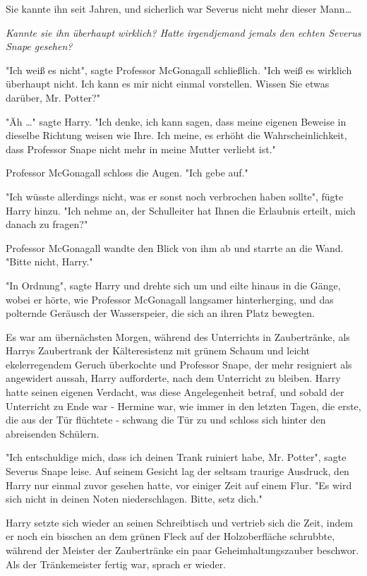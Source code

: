{Sie kannte ihn seit Jahren, und sicherlich war Severus nicht mehr dieser Mann…

\emph{Kannte sie ihn überhaupt wirklich? Hatte irgendjemand jemals den echten Severus Snape gesehen?}

"Ich weiß es nicht", sagte Professor McGonagall schließlich. "Ich weiß es wirklich überhaupt nicht. Ich kann es mir nicht einmal vorstellen. Wissen Sie etwas darüber, Mr. Potter?"

"Äh …" sagte Harry. "Ich denke, ich kann sagen, dass meine eigenen Beweise in dieselbe Richtung weisen wie Ihre. Ich meine, es erhöht die Wahrscheinlichkeit, dass Professor Snape nicht mehr in meine Mutter verliebt ist."

Professor McGonagall schloss die Augen. "Ich gebe auf."

"Ich wüsste allerdings nicht, was er sonst noch verbrochen haben sollte", fügte Harry hinzu. "Ich nehme an, der Schulleiter hat Ihnen die Erlaubnis erteilt, mich danach zu fragen?"

Professor McGonagall wandte den Blick von ihm ab und starrte an die Wand.\\ "Bitte nicht, Harry."

"In Ordnung", sagte Harry und drehte sich um und eilte hinaus in die Gänge, wobei er hörte, wie Professor McGonagall langsamer hinterherging, und das polternde Geräusch der Wasserspeier, die sich an ihren Platz bewegten.

Es war am übernächsten Morgen, während des Unterrichts in Zaubertränke, als Harrys Zaubertrank der Kälteresistenz mit grünem Schaum und leicht ekelerregendem Geruch überkochte und Professor Snape, der mehr resigniert als angewidert aussah, Harry aufforderte, nach dem Unterricht zu bleiben. Harry hatte seinen eigenen Verdacht, was diese Angelegenheit betraf, und sobald der Unterricht zu Ende war - Hermine war, wie immer in den letzten Tagen, die erste, die aus der Tür flüchtete - schwang die Tür zu und schloss sich hinter den abreisenden Schülern.

"Ich entschuldige mich, dass ich deinen Trank ruiniert habe, Mr. Potter", sagte Severus Snape leise. Auf seinem Gesicht lag der seltsam traurige Ausdruck, den Harry nur einmal zuvor gesehen hatte, vor einiger Zeit auf einem Flur. "Es wird sich nicht in deinen Noten niederschlagen. Bitte, setz dich."

Harry setzte sich wieder an seinen Schreibtisch und vertrieb sich die Zeit, indem er noch ein bisschen an dem grünen Fleck auf der Holzoberfläche schrubbte, während der Meister der Zaubertränke ein paar Geheimhaltungszauber beschwor. Als der Tränkemeister fertig war, sprach er wieder.

}
